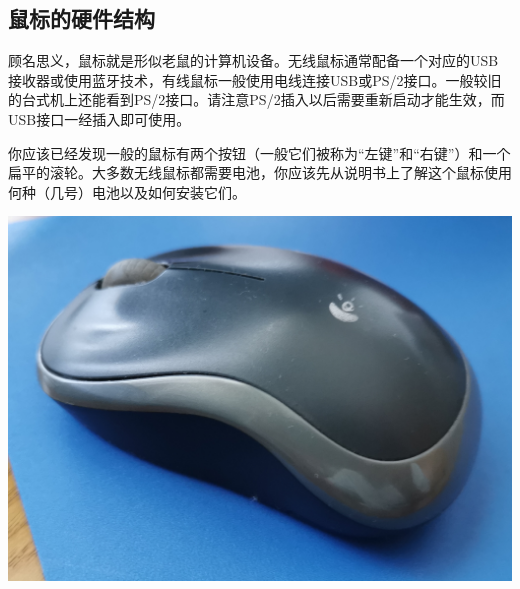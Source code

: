\subsection{鼠标的硬件结构}
顾名思义，鼠标就是形似老鼠的计算机设备。无线鼠标通常配备一个对应的USB接收器或使用蓝牙技术，有线鼠标一般使用电线连接USB或PS/2接口。一般较旧的台式机上还能看到PS/2接口。请注意PS/2插入以后需要重新启动才能生效，而USB接口一经插入即可使用。\par
你应该已经发现一般的鼠标有两个按钮（一般它们被称为“左键”和“右键”）和一个扁平的滚轮。大多数无线鼠标都需要电池，你应该先从说明书上了解这个鼠标使用何种（几号）电池以及如何安装它们。
\begin{center}
	\includegraphics[scale=0.05]{pic/Mouse}
\end{center}\par
